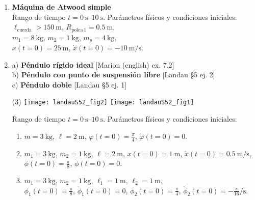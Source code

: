 \documentclass[11pt, spanish, a4paper, twoside]{article}
\begin{document}
\begin{enumerate}


\item 
\begin{minipage}[t][2.5cm]{0.7\textwidth}
\textbf{Máquina de Atwood simple}\\
Rango de tiempo \(t = \SIrange{0}{10}{\second}\).
Parámetros físicos y condiciones iniciales:\\
\(\ell_\mathrm{cuerda} > \SI{150}{\metre}\), 
\(R_{\mathrm{polea}\,1} = \SI{0.5}{\metre}\), \\ 
\(m_1 = \SI{8}{\kilo\gram}\), 
\(m_2 = \SI{1}{\kilo\gram}\), 
\(m_p = \SI{4}{\kilo\gram}\), \\
\(x(t=0) = \SI{25}{\metre}\), 
\(\dot{x}(t=0) = -\SI{10}{\metre\per\second}\).
\end{minipage}
\begin{minipage}[c][2cm][t]{0.3\textwidth}
	
\end{minipage}



\item
	a) \textbf{Péndulo rígido ideal} [Marion (english) ex. 7.2] \\
	b) \textbf{Péndulo con punto de suspensión libre} [Landau \S5 ej. 2]\\ 
	c) \textbf{Péndulo doble} [Landau \S5 ej. 1] 
\begin{tasks}(3)
	\task 
	\task \texttt{[image: landauS52\_fig2]}
	\task \texttt{[image: landauS52\_fig1]}
\end{tasks}
Rango de tiempo \(t = \SIrange{0}{10}{\second}\).
Parámetros físicos y condiciones iniciales: 
\begin{enumerate}
	\item \(m = \SI{3}{\kilo\gram}\), 
				\(\ell = \SI{2}{\metre}\), 
				\(\varphi (t=0) = \frac{\pi}{4}\), \(\dot{\varphi} (t=0) = 0\).
	\item \(m_1 = \SI{3}{\kilo\gram}\), \(m_2 = \SI{1}{\kilo\gram}\),   
				\(\ell = \SI{2}{\metre}\), 
				\(x(t=0) = \SI{1}{\metre}\), \(\dot{x} (t=0) = \SI{0.5}{\metre\per\second} \),
				\(\phi (t=0) = \frac{\pi}{8}\), \(\dot{\phi} (t=0) = 0\).
	\item \(m_1 = \SI{3}{\kilo\gram}\), \(m_2 = \SI{1}{\kilo\gram}\),
				\(\ell_1 = \SI{1}{\metre}\), \(\ell_2 = \SI{1}{\metre}\),\\ 
				\(\phi_1 (t=0) = \frac{\pi}{8}\), \(\dot{\phi}_1 (t=0) = 0\), 
				\(\phi_2 (t=0) = \frac{\pi}{4}\), \(\dot{\phi}_2 (t=0) = -\frac{\pi}{16} \si{\per\second}\).
\end{enumerate}



\end{enumerate}
\end{document}
